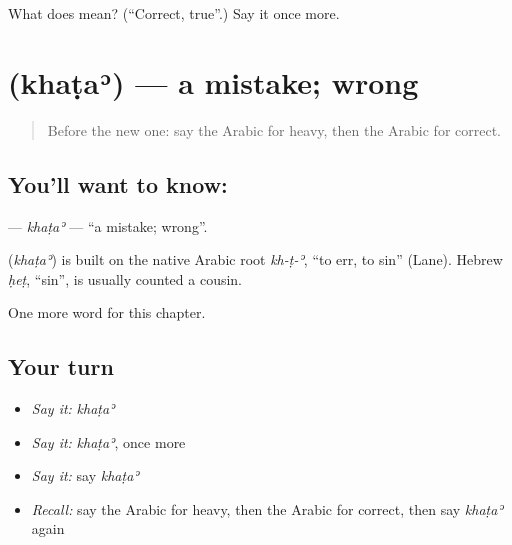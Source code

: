 \begin{tcolorbox}[breakable,colback=teal!4,colframe=teal!35!black,title={Before you move on}]
What does  mean? (\textquotedblleft{}Correct, true\textquotedblright{}.) Say it once more.
\end{tcolorbox}
\section[\texorpdfstring{\ar{خطأ} (khaṭaʾ)}{خطأ (khaṭaʾ)}]{ (khaṭaʾ) — a mistake; wrong}

\label{lesson:AR-C85-khata}



\begin{quote}
Before the new one: say the Arabic for heavy, then the Arabic for correct.
\end{quote}

\subsection*{You'll want to know: }
\textbf{} — \emph{khaṭaʾ} — \textquotedblleft{}a mistake; wrong\textquotedblright{}.

\begin{cousinweb}
\textbf{} (\emph{khaṭaʾ}) is built on the native Arabic root \emph{kh-ṭ-ʾ}, \textquotedblleft{}to err, to sin\textquotedblright{} (Lane). Hebrew \emph{ḥeṭ}, \textquotedblleft{}sin\textquotedblright{}, is usually counted a cousin.
\end{cousinweb}

\begin{grammarlens}[title={What you've built}]
One more word for this chapter.
\end{grammarlens}

\subsection*{Your turn}
\begin{itemize}
\raggedright
  \item \emph{Say it:} \emph{khaṭaʾ}
  \item \emph{Say it:} \emph{khaṭaʾ}, once more
  \item \emph{Say it:} say \emph{khaṭaʾ}
  \item \emph{Recall:} say the Arabic for heavy, then the Arabic for correct, then say \emph{khaṭaʾ} again
\end{itemize}

